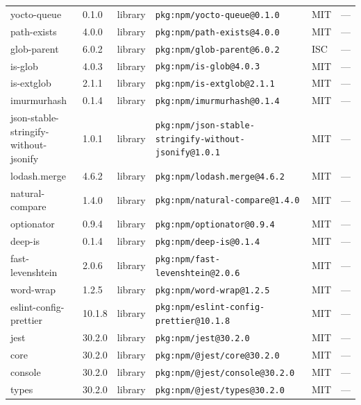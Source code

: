 \documentclass[11pt,a4paper]{article}
\begin{document}
\begin{longtable}{|p{4cm}|p{2cm}|p{1.6cm}|p{5cm}|p{1.5cm}|p{3.5cm}|}
\raggedright yocto-queue & 0.1.0 & library & \small\texttt{pkg:npm/yocto-queue@0.1.0} & MIT & \small — \\
\raggedright path-exists & 4.0.0 & library & \small\texttt{pkg:npm/path-exists@4.0.0} & MIT & \small — \\
\raggedright glob-parent & 6.0.2 & library & \small\texttt{pkg:npm/glob-parent@6.0.2} & ISC & \small — \\
\raggedright is-glob & 4.0.3 & library & \small\texttt{pkg:npm/is-glob@4.0.3} & MIT & \small — \\
\raggedright is-extglob & 2.1.1 & library & \small\texttt{pkg:npm/is-extglob@2.1.1} & MIT & \small — \\
\raggedright imurmurhash & 0.1.4 & library & \small\texttt{pkg:npm/imurmurhash@0.1.4} & MIT & \small — \\
\raggedright json-stable-stringify-without-jsonify & 1.0.1 & library & \small\texttt{pkg:npm/json-stable-stringify-without-jsonify@1.0.1} & MIT & \small — \\
\raggedright lodash.merge & 4.6.2 & library & \small\texttt{pkg:npm/lodash.merge@4.6.2} & MIT & \small — \\
\raggedright natural-compare & 1.4.0 & library & \small\texttt{pkg:npm/natural-compare@1.4.0} & MIT & \small — \\
\raggedright optionator & 0.9.4 & library & \small\texttt{pkg:npm/optionator@0.9.4} & MIT & \small — \\
\raggedright deep-is & 0.1.4 & library & \small\texttt{pkg:npm/deep-is@0.1.4} & MIT & \small — \\
\raggedright fast-levenshtein & 2.0.6 & library & \small\texttt{pkg:npm/fast-levenshtein@2.0.6} & MIT & \small — \\
\raggedright word-wrap & 1.2.5 & library & \small\texttt{pkg:npm/word-wrap@1.2.5} & MIT & \small — \\
\raggedright eslint-config-prettier & 10.1.8 & library & \small\texttt{pkg:npm/eslint-config-prettier@10.1.8} & MIT & \small — \\
\raggedright jest & 30.2.0 & library & \small\texttt{pkg:npm/jest@30.2.0} & MIT & \small — \\
\raggedright core & 30.2.0 & library & \small\texttt{pkg:npm/@jest/core@30.2.0} & MIT & \small — \\
\raggedright console & 30.2.0 & library & \small\texttt{pkg:npm/@jest/console@30.2.0} & MIT & \small — \\
\raggedright types & 30.2.0 & library & \small\texttt{pkg:npm/@jest/types@30.2.0} & MIT & \small — \\

\end{longtable}
\end{document}
